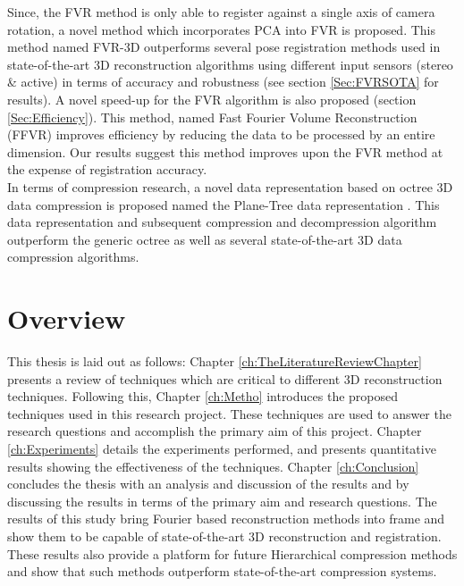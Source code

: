 Since, the FVR method is only able to register against a single axis of camera rotation, a novel method which incorporates PCA into FVR is proposed. This method named FVR-3D outperforms several pose registration methods used in state-of-the-art 3D reconstruction algorithms using different input sensors (stereo \& active) in terms of accuracy and robustness (see section \ref{Sec:FVRSOTA} for results). A novel speed-up for the FVR algorithm is also proposed (section \ref{Sec:Efficiency}). This method, named Fast Fourier Volume Reconstruction (FFVR) improves efficiency by reducing the data to be processed by an entire dimension. Our results suggest this method improves upon the FVR method at the expense of registration accuracy. \\

In terms of compression research, a novel data representation based on octree 3D data compression is proposed named the Plane-Tree data representation \cite{Lincoln15Plane}. This data representation and subsequent compression and decompression algorithm outperform the generic octree as well as several state-of-the-art 3D data compression algorithms. \\


\section{Overview}

This thesis is laid out as follows: Chapter \ref{ch:TheLiteratureReviewChapter} presents a review of techniques which are critical to different 3D reconstruction techniques. Following this, Chapter \ref{ch:Metho} introduces the proposed techniques used in this research project. These techniques are used to answer the research questions and accomplish the primary aim of this project. Chapter \ref{ch:Experiments} details the experiments performed, and presents quantitative results showing the effectiveness of the techniques. Chapter \ref{ch:Conclusion} concludes the thesis with an analysis and discussion of the results and by discussing the results in terms of the primary aim and research questions. The results of this study bring Fourier based reconstruction methods into frame and show them to be capable of state-of-the-art 3D reconstruction and registration. These results also provide a platform for future Hierarchical compression methods and show that such methods outperform state-of-the-art compression systems.


